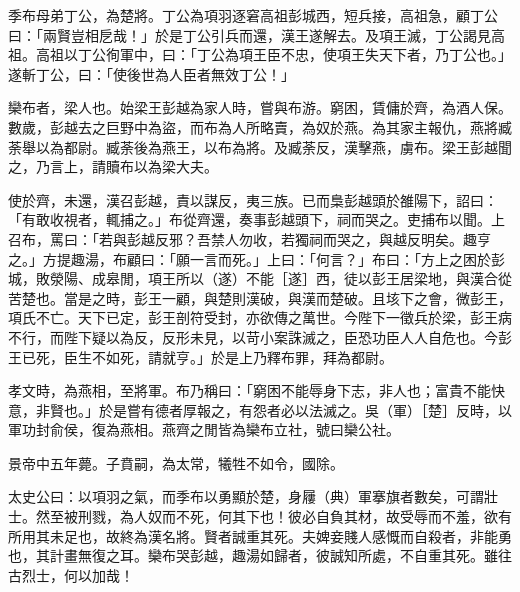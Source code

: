 \begin{pinyinscope}
季布母弟丁公，為楚將。丁公為項羽逐窘高祖彭城西，短兵接，高祖急，顧丁公曰：「兩賢豈相戹哉！」於是丁公引兵而還，漢王遂解去。及項王滅，丁公謁見高祖。高祖以丁公徇軍中，曰：「丁公為項王臣不忠，使項王失天下者，乃丁公也。」遂斬丁公，曰：「使後世為人臣者無效丁公！」

欒布者，梁人也。始梁王彭越為家人時，嘗與布游。窮困，賃傭於齊，為酒人保。數歲，彭越去之巨野中為盜，而布為人所略賣，為奴於燕。為其家主報仇，燕將臧荼舉以為都尉。臧荼後為燕王，以布為將。及臧荼反，漢擊燕，虜布。梁王彭越聞之，乃言上，請贖布以為梁大夫。

使於齊，未還，漢召彭越，責以謀反，夷三族。已而梟彭越頭於雒陽下，詔曰：「有敢收視者，輒捕之。」布從齊還，奏事彭越頭下，祠而哭之。吏捕布以聞。上召布，罵曰：「若與彭越反邪？吾禁人勿收，若獨祠而哭之，與越反明矣。趣亨之。」方提趣湯，布顧曰：「願一言而死。」上曰：「何言？」布曰：「方上之困於彭城，敗滎陽、成皋閒，項王所以（遂）不能［遂］西，徒以彭王居梁地，與漢合從苦楚也。當是之時，彭王一顧，與楚則漢破，與漢而楚破。且垓下之會，微彭王，項氏不亡。天下已定，彭王剖符受封，亦欲傳之萬世。今陛下一徵兵於梁，彭王病不行，而陛下疑以為反，反形未見，以苛小案誅滅之，臣恐功臣人人自危也。今彭王已死，臣生不如死，請就亨。」於是上乃釋布罪，拜為都尉。

孝文時，為燕相，至將軍。布乃稱曰：「窮困不能辱身下志，非人也；富貴不能快意，非賢也。」於是嘗有德者厚報之，有怨者必以法滅之。吳（軍）［楚］反時，以軍功封俞侯，復為燕相。燕齊之閒皆為欒布立社，號曰欒公社。

景帝中五年薨。子賁嗣，為太常，犧牲不如令，國除。

太史公曰：以項羽之氣，而季布以勇顯於楚，身屨（典）軍搴旗者數矣，可謂壯士。然至被刑戮，為人奴而不死，何其下也！彼必自負其材，故受辱而不羞，欲有所用其未足也，故終為漢名將。賢者誠重其死。夫婢妾賤人感慨而自殺者，非能勇也，其計畫無復之耳。欒布哭彭越，趣湯如歸者，彼誠知所處，不自重其死。雖往古烈士，何以加哉！


\end{pinyinscope}